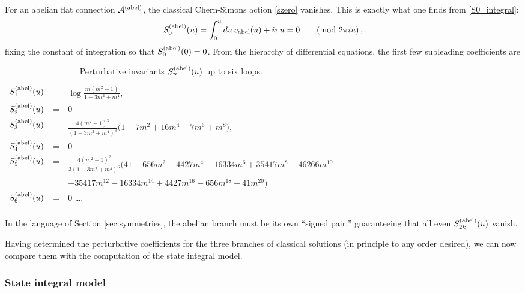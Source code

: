 \documentclass[hyper]{JHEP3}
\def\CA {{\cal A}}
\newcommand\be{\begin{equation}}
\newcommand\ee{\end{equation}}
\begin{document}
For an abelian flat connection $\CA^{({\rm abel})}$, the classical
Chern-Simons action \eqref{szero} vanishes.
This is exactly what one finds from \eqref{S0_integral}:
\be
S_0^{({\rm abel})} (u) =\int_0^u du\, v_{{\rm abel}} (u)
+ i\pi u = 0 \qquad (\mbox{mod $2\pi i u$})\,,
\ee
fixing the constant of integration so that $S_0^{(\rm abel)}(0)=0$.
From the hierarchy of differential equations, the first few subleading coefficients are
\begin{longtable}{r@{\;}c@{\;}l}
$S_1^{({\rm abel})}(u)$ &=& $\displaystyle\log\frac{m(m^2-1)}{1 - 3 m^2 + m^4}, $\vspace{.2cm} \\  $
S_2^{({\rm abel})}(u)$ &=& $0$\vspace{.2cm} \\  $
S_3^{({\rm abel})}(u)$ &=& $\displaystyle \frac{4(m^2-1)^2}{(1 - 3 m^2 + m^4)^3}\big(1-7m^2+16m^4-7m^6+m^8\big) , $\vspace{.2cm} \\  $
S_4^{({\rm abel})}(u)$ &=& $0$\vspace{.2cm} \\  $
S_5^{({\rm abel})}(u)$ &=& $\displaystyle \frac{4(m^2-1)^2}{3(1 - 3 m^2 + m^4)^6}\big(41 - 656 m^2 + 4427 m^4 - 16334 m^6 + 35417 m^8 - 46266 m^{10}$ \vspace{.2cm} \\ && $ + 
 35417 m^{12} - 16334 m^{14} + 4427 m^{16} - 656 m^{18} + 41 m^{20}\big) $\vspace{.2cm} \\  $
S_6^{({\rm abel})}(u)$ &=& $0$ \;\ldots. \vspace{0.5cm}\\
\caption{Perturbative invariants $S_n^{({\rm abel})}(u)$ up to six loops.\label{tab:figeightabel}}
\end{longtable}

\noindent
In the language of Section \ref{sec:symmetries},
the abelian branch must be its own ``signed pair,''
guaranteeing that all even $S_{2k}^{(\rm abel)}(u)$ vanish.

Having determined the perturbative coefficients
for the three branches of classical solutions (in principle to any order desired),
we can now compare them with the computation of the state integral model.


\subsubsection{State integral model}
\label{sec:figeightsum}
\end{document}
